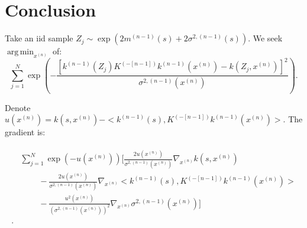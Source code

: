 \documentclass[paper=a4, fontsize=11pt]{scrartcl} %
\DeclareMathOperator*{\argmin}{arg\,min}
\numberwithin{equation}{section} %
\numberwithin{figure}{section} %
\numberwithin{table}{section} %
\newcommand{\bars}{ \ \ \ \ \ \ \ \ \ \ }
\newcommand{\gxn}{\nabla_{x^{(n)}}} %
\newcommand{\xn}{x^{(n)}} %
\newcommand{\mnm}{m^{(n-1)}}
\newcommand{\knm}{k^{(n-1)}}
\newcommand{\Kinvnm}{K^{(-[n-1])}}
\newcommand{\sqnm}{\sigma ^{2 , (n-1)}     }
\begin{document}
\section{Conclusion}
Take an iid sample $Z_j \sim \exp( 2\mnm (s) +2\sqnm(s) )$. We seek $\argmin_{\xn}$ of:
$$
\sum_{j=1}^{N} \exp(-\frac{[ \knm(Z_j) \Kinvnm \knm(\xn) -k(Z_j,\xn)]^2}{\sqnm(\xn)}).
$$

Denote $u(\xn) = k(s, \xn)  - < \knm (s) ,  \Kinvnm \knm (\xn) > $. The gradient is:

\begin{align}
 \begin{split}
&\sum_{j=1}^{N} \exp(-u(\xn))[ \frac{ 2u(\xn)}{\sqnm(\xn)} \gxn k(s , \xn) \\
	    &\bars - \frac{ 2u(\xn)}{\sqnm(\xn)} \gxn< \knm (s) ,  \Kinvnm \knm (\xn) > \\
	    &\bars - \frac{u^2(\xn)}{(\sqnm(\xn))^2}\gxn \sqnm (\xn)] \\\\.
 \end{split}
\end{align}
\end{document}
